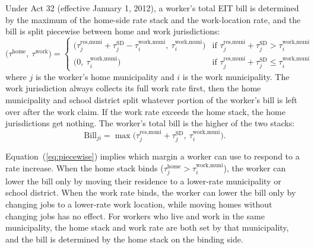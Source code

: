 \documentclass[12pt]{article}
\begin{document}
Under Act 32 (effective January 1, 2012), a worker's total EIT bill
is determined by the maximum of the home-side rate stack and the
work-location rate, and the bill is split piecewise
between home and work jurisdictions:
%
\begin{equation}
\bigl(\tau^{\text{home}},\ \tau^{\text{work}}\bigr) =
\begin{cases}
\bigl(\tau^{\text{res,muni}}_j + \tau^{\text{SD}}_j - \tau^{\text{work,muni}}_i,\ \tau^{\text{work,muni}}_i\bigr)
   & \text{if } \tau^{\text{res,muni}}_j + \tau^{\text{SD}}_j > \tau^{\text{work,muni}}_i \\[4pt]
\bigl(0,\ \tau^{\text{work,muni}}_i\bigr)
   & \text{if } \tau^{\text{res,muni}}_j + \tau^{\text{SD}}_j \leq \tau^{\text{work,muni}}_i
\end{cases}
\label{eq:piecewise}
\end{equation}
%
where $j$ is the worker's home municipality and $i$ is the work municipality. The
work jurisdiction always collects its full work rate first, then
the home municipality and school district split whatever portion of the
worker's bill is left over after the work claim. If the work
rate exceeds the home stack, the home jurisdictions get nothing. The
worker's total bill is the higher of the two stacks:
%
\begin{equation}
\text{Bill}_{ji} = \max\!\bigl(\tau^{\text{res,muni}}_j + \tau^{\text{SD}}_j,\ \tau^{\text{work,muni}}_i\bigr).
\label{eq:bill}
\end{equation}

Equation~(\ref{eq:piecewise}) implies which margin a worker can use to
respond to a rate increase. When the home stack binds
($\tau^{\text{home}}_j > \tau^{\text{work,muni}}_i$), the worker can lower
the bill only by moving their residence to a lower-rate municipality or school district.
When the work rate binds, the worker can lower the bill
only by changing jobs to a lower-rate work location, while moving homes
without changing jobs has no effect. For workers who live and work in
the same municipality, the home stack and work rate are both set by that municipality, and the bill is determined by the home stack on the binding side.
\end{document}
